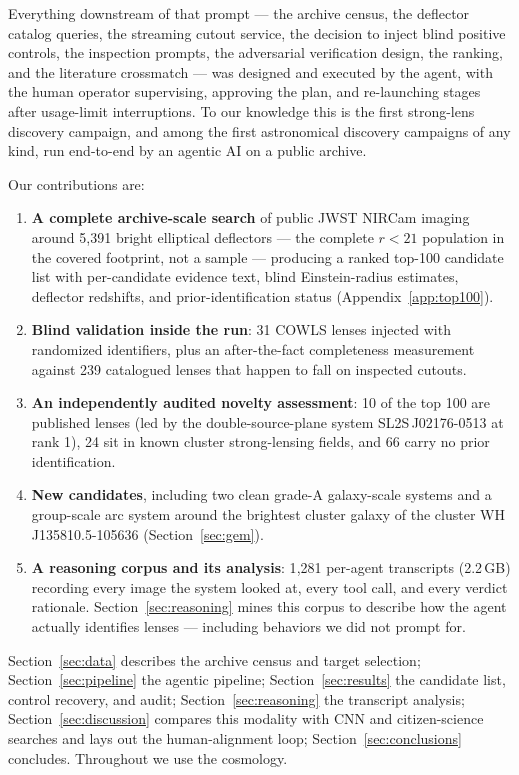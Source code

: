\documentclass[11pt,letterpaper]{article}
\newcommand{\numtargets}{5{,}391}
\begin{document}
Everything downstream of that prompt --- the archive census, the deflector
catalog queries, the streaming cutout service, the decision to inject blind
positive controls, the inspection prompts, the adversarial verification
design, the ranking, and the literature crossmatch --- was designed and
executed by the agent, with the human operator supervising, approving the
plan, and re-launching stages after usage-limit interruptions. To our
knowledge this is the first strong-lens discovery campaign, and among the
first astronomical discovery campaigns of any kind, run end-to-end by an
agentic AI on a public archive.

Our contributions are:
\begin{enumerate}
  \item \textbf{A complete archive-scale search} of public JWST NIRCam imaging
    around \numtargets{} bright elliptical deflectors --- the complete
    $r<21$ population in the covered footprint, not a sample --- producing a
    ranked top-100 candidate list with per-candidate evidence text, blind
    Einstein-radius estimates, deflector redshifts, and prior-identification
    status (Appendix~\ref{app:top100}).
  \item \textbf{Blind validation inside the run}: 31 COWLS lenses
    \citep{nightingale2025cowls1} injected with randomized identifiers,
    plus an after-the-fact completeness measurement against 239 catalogued
    lenses that happen to fall on inspected cutouts.
  \item \textbf{An independently audited novelty assessment}: 10 of the top
    100 are published lenses (led by the double-source-plane system
    SL2S\,J02176-0513 at rank 1), 24 sit in known cluster strong-lensing
    fields, and 66 carry no prior identification.
  \item \textbf{New candidates}, including two clean grade-A galaxy-scale
    systems and a group-scale arc system around the brightest cluster galaxy
    of the \citet{wen2024catalog} cluster WH\,J135810.5-105636
    (Section~\ref{sec:gem}).
  \item \textbf{A reasoning corpus and its analysis}: 1{,}281 per-agent
    transcripts (2.2\,GB) recording every image the system looked at, every
    tool call, and every verdict rationale. Section~\ref{sec:reasoning} mines
    this corpus to describe how the agent actually identifies lenses ---
    including behaviors we did not prompt for.
\end{enumerate}

Section~\ref{sec:data} describes the archive census and target selection;
Section~\ref{sec:pipeline} the agentic pipeline; Section~\ref{sec:results} the
candidate list, control recovery, and audit; Section~\ref{sec:reasoning} the
transcript analysis; Section~\ref{sec:discussion} compares this modality with
CNN and citizen-science searches and lays out the human-alignment loop;
Section~\ref{sec:conclusions} concludes. Throughout we use the
\citet{planck2020params} cosmology.
\end{document}
